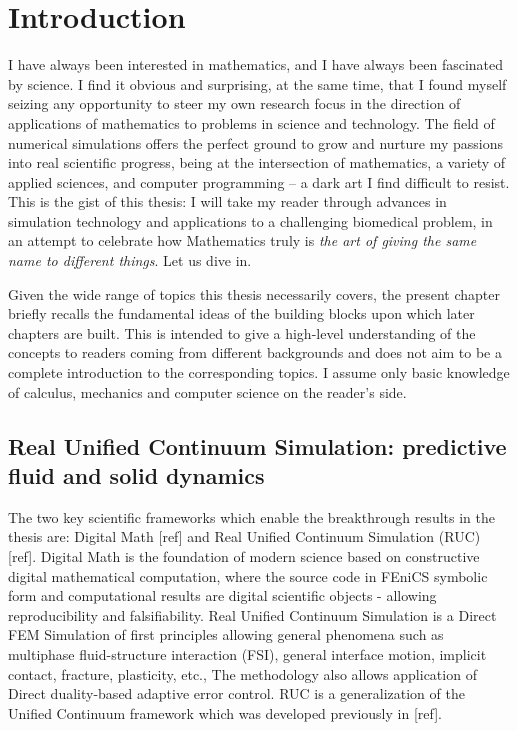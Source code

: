 \chapter{Introduction}
\label{cha_introduction}

I have always been interested in mathematics, and I have always been fascinated by science.
I find it obvious and surprising, at the same time, that I found myself seizing any opportunity to steer my own research focus in the direction of applications of mathematics to problems in science and technology.
The field of numerical simulations offers the perfect ground to grow and nurture my passions into real scientific progress, being at the intersection of mathematics, a variety of applied sciences, and computer programming -- a dark art I find difficult to resist.
This is the gist of this thesis: I will take my reader through advances in simulation technology and applications to a challenging biomedical problem, in an attempt to celebrate how Mathematics truly is \emph{the art of giving the same name to different things}.
Let us dive in.

Given the wide range of topics this thesis necessarily covers, the present
chapter briefly recalls the fundamental ideas of the building blocks
upon which later chapters are built.
This is intended to give a high-level understanding of the
concepts to readers coming from different backgrounds and does not aim
to be a complete introduction to the corresponding topics.
I assume only basic knowledge of calculus, mechanics and computer
science on the reader's side.

\section{Real Unified Continuum Simulation: predictive fluid and solid dynamics}
\label{sec_cfd}
The two key scientific frameworks which enable the breakthrough
results in the thesis are: Digital Math [ref] and Real Unified Continuum
Simulation (RUC) [ref]. Digital Math is the foundation of modern
science based on constructive digital mathematical computation, where
the source code in FEniCS symbolic form and computational results are
digital scientific objects - allowing reproducibility and
falsifiability. Real Unified Continuum Simulation is a Direct FEM
Simulation of first principles allowing general phenomena such as
multiphase fluid-structure interaction (FSI), general interface
motion, implicit contact, fracture, plasticity, etc., The methodology
also allows application of Direct duality-based adaptive error
control. RUC is a generalization of the Unified Continuum framework
which was developed previously in [ref].

